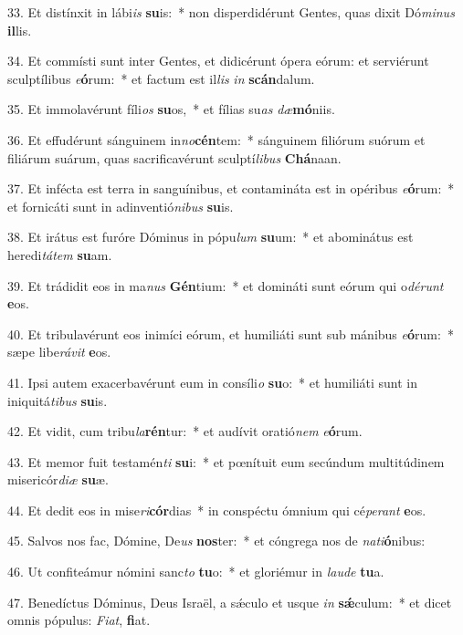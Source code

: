 33. Et distínxit in lábi\textit{is} \textbf{su}is:~*  non disperdidérunt Gentes, quas dixit Dó\textit{mi}\textit{nus} \textbf{il}lis.\

34. Et commísti sunt inter Gentes, et didicérunt ópera eórum: et serviérunt sculptílibus \textit{e}\textbf{ó}rum:~*  et factum est il\textit{lis} \textit{in} \textbf{scán}dalum.\

35. Et immolavérunt fíli\textit{os} \textbf{su}os,~*  et fílias su\textit{as} \textit{dæ}\textbf{mó}niis.\

36. Et effudérunt sánguinem in\textit{no}\textbf{cén}tem:~*  sánguinem filiórum suórum et filiárum suárum, quas sacrificavérunt sculptí\textit{li}\textit{bus} \textbf{Chá}naan.\

37. Et infécta est terra in sanguínibus, et contamináta est in opéribus \textit{e}\textbf{ó}rum:~*  et fornicáti sunt in adinventió\textit{ni}\textit{bus} \textbf{su}is.\

38. Et irátus est furóre Dóminus in pópu\textit{lum} \textbf{su}um:~*  et abominátus est heredi\textit{tá}\textit{tem} \textbf{su}am.\

39. Et trádidit eos in ma\textit{nus} \textbf{Gén}tium:~*  et domináti sunt eórum qui o\textit{dé}\textit{runt} \textbf{e}os.\

40. Et tribulavérunt eos inimíci eórum, et humiliáti sunt sub mánibus \textit{e}\textbf{ó}rum:~*  sæpe libe\textit{rá}\textit{vit} \textbf{e}os.\

41. Ipsi autem exacerbavérunt eum in consíli\textit{o} \textbf{su}o:~*  et humiliáti sunt in iniquitá\textit{ti}\textit{bus} \textbf{su}is.\

42. Et vidit, cum tribu\textit{la}\textbf{rén}tur:~*  et audívit oratió\textit{nem} \textit{e}\textbf{ó}rum.\

43. Et memor fuit testamén\textit{ti} \textbf{su}i:~*  et pœnítuit eum secúndum multitúdinem misericór\textit{di}\textit{æ} \textbf{su}æ.\

44. Et dedit eos in mise\textit{ri}\textbf{cór}dias~*  in conspéctu ómnium qui cé\textit{pe}\textit{rant} \textbf{e}os.\

45. Salvos nos fac, Dómine, De\textit{us} \textbf{nos}ter:~*  et cóngrega nos de \textit{na}\textit{ti}\textbf{ó}nibus:\

46. Ut confiteámur nómini sanc\textit{to} \textbf{tu}o:~*  et gloriémur in \textit{lau}\textit{de} \textbf{tu}a.\

47. Benedíctus Dóminus, Deus Israël, a sǽculo et usque \textit{in} \textbf{sǽ}culum:~*  et dicet omnis pópulus: \textit{Fi}\textit{at}, \textbf{fi}at.\

